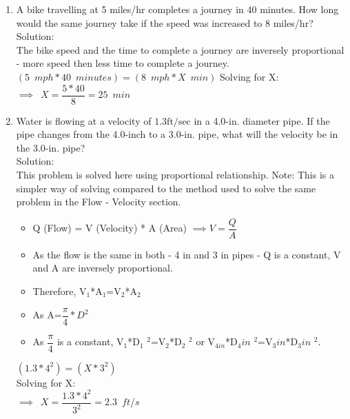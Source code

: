 \begin{enumerate}
\item A bike travelling at 5 miles/hr completes a journey in 40 minutes. How long would the same journey take if the speed was increased to 8 miles/hr?\\
Solution:\\
\vspace{0.2cm}
The bike speed and the time to complete a journey are inversely proportional - more speed then less time to complete a journey.\\
\vspace{0.2cm}
$(5 \enspace mph * 40 \enspace minutes)=(8 \enspace mph * X \enspace min)$
\vspace{0.2cm}
Solving for X:\\
\vspace{0.2cm}
$\implies \enspace X=\dfrac{5*40}{8}=\boxed{25 \enspace min}$
\vspace{0.2cm}
\item Water is flowing at a velocity of $1.3 \mathrm{ft} / \mathrm{sec}$ in a 4.0-in. diameter pipe. If the pipe changes from the 4.0-inch to a 3.0-in. pipe, what will the velocity be in the 3.0-in. pipe?\\
Solution:\\
\vspace{0.2cm}
This problem is solved here using proportional relationship.  Note:  This is a simpler way of solving compared to the method used to solve the same problem in the Flow - Velocity section.\\
\begin{itemize}
\item Q (Flow) = V (Velocity) * A (Area) $\implies V = \dfrac{Q}{A}$
\item As the flow is the same in both - 4 in and 3 in pipes - Q is a constant, V and A are inversely proportional.
\item Therefore, V$_1$*A$_1$=V$_2$*A$_2$
\item As A=$\dfrac{\pi}{4}*D^2$
\item As $\dfrac{\pi}{4}$ is a constant, V$_1$*D$_1$ $^2$=V$_2$*D$_2$ $^2$ or V$_{4in}$*D${_4in}$ $^2$=V${_3in}$*D${_3in}$ ${^2}$.
\end{itemize}
\vspace{0.2cm}
$(1.3* 4^2)=(X*3^2)$\\
\vspace{0.2cm}
Solving for X:\\
\vspace{0.2cm}
$\implies \enspace X=\dfrac{1.3*4^2}{3^2}=\boxed{2.3 \enspace ft/s}$
\vspace{0.2cm}




\end{enumerate}
